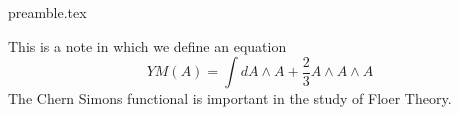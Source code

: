 
\RequirePackage{import}
{preamble.tex}



    This is a note in which we define an equation
    \begin{equation} \label{equation:chern simons functional}
        YM(A) = \int dA \wedge A + \frac23 A \wedge A \wedge A
    \end{equation}
    The Chern Simons functional is important in the study of Floer Theory.

